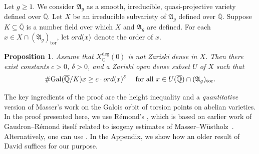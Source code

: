 \documentclass[12pt,oneside]{amsart}
\newcounter{maincounter}
\numberwithin{maincounter}{section}
\numberwithin{equation}{section}
\newtheorem{proposition}[maincounter]{Proposition}
\def\CC{\mathbb{C}}
\def\QQ{\mathbb{Q}}
\newcommand{\IC}{{\CC}}
\newcommand{\IQbar}{{\overline{\QQ}}}
\newcommand{\ord}[1]{{\rm ord}({#1})}
\renewcommand{\subset}{\subseteq} %
\begin{document}
Let $g\ge 1$. We consider $\mathfrak{A}_g$ as a smooth, irreducible,
quasi-projective variety defined over $\IQbar$.
Let $X$ be an irreducible subvariety of $\mathfrak{A}_g$ defined over
$\IQbar$. Suppose $K\subset\IQbar$ is a number field over which $X$
and $\mathfrak{A}_g$ are defined. For each $x \in X \cap
(\mathfrak{A}_g)_{\mathrm{tor}}$, let $\ord{x}$ denote the order of
$x$.

\begin{proposition}\label{PropLGO}
  Assume that $X_\IC^{\mathrm{deg}}(0)$ is not Zariski dense in $X$. Then there exist constants $c>0$, $\delta>0$, and a Zariski open dense subset $U$ of $X$ such that
  \begin{equation}
    \#\mathrm{Gal}(\IQbar/K) x \ge c \cdot \ord{x}^{\delta} \quad \text{ for all }x \in U(\IQbar) \cap (\mathfrak{A}_g)_{\mathrm{tor}}.
  \end{equation}
\end{proposition}

The key ingredients of the proof are the height inequality
\cite[Theorems 1.6 and B.1]{DGHUnifML} and a \textit{quantitative} version of Masser's work on  the Galois orbit of torsion points on abelian varieties. In the proof presented here, we use R\'{e}mond's \cite[Proposition~2.9]{RemondGaloisBound}, which
is based on
earlier work of 
Gaudron--R\'{e}mond \cite{GR:Isogeny} itself related to isogeny
estimates of  Masser--W\"{u}stholz~\cite{MW:abelianisog}.
Alternatively, one can use \cite[Corollaire~1.7]{GRGaloisBound}.
In the Appendix, we show how an older result of David \cite{DavidMinHaut} suffices for our purpose. %



\end{document}
